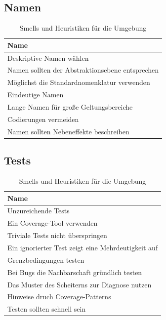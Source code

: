 \subsection{Namen}

\begin{table}[h]
	\centering
		 \begin{tabular}{ | l | }
		 \hline
			Name \\  \hline
			Deskriptive Namen wählen \\
			Namen sollten der Abstraktionsebene entsprechen \\
			Möglichst die Standardnomenklatur verwenden \\
			Eindeutige Namen \\
			Lange Namen für große Geltungsbereiche \\
			Codierungen vermeiden \\
			Namen sollten Nebeneffekte beschreiben \\ \hline
		\end{tabular}
	\caption{Smells und Heuristiken für die Umgebung}
	\label{tab:SmellsUndHeuristiken_Umgebung}
\end{table}


\subsection{Tests}

\begin{table}[h]
	\centering
		 \begin{tabular}{ | l | }
		 \hline
			Name \\  \hline
			Unzureichende Tests \\
			Ein Coverage-Tool verwenden \\
			Triviale Tests nicht überspringen \\
			Ein ignorierter Test zeigt eine Mehrdeutigkeit auf \\
			Grenzbedingungen testen \\
			Bei Bugs die Nachbarschaft gründlich testen \\
			Das Muster des Scheiterns zur Diagnose nutzen \\
			Hinweise druch Coverage-Patterns \\
			Testen sollten schnell sein \\ \hline
		\end{tabular}
	\caption{Smells und Heuristiken für die Umgebung}
	\label{tab:SmellsUndHeuristiken_Umgebung}
\end{table}

